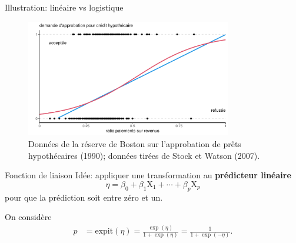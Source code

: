 \documentclass[
  ignorenonframetext,
]{beamer}
\begin{document}
\begin{frame}{Illustration: linéaire vs logistique}
\protect\hypertarget{illustration-linuxe9aire-vs-logistique}{}
\begin{figure}

{\centering \includegraphics[width=0.8\textwidth,height=\textheight]{MATH60602-diapos5_files/figure-beamer/fig-demandecredit-1.pdf}

}

\caption{\label{fig-demandecredit}Données de la réserve de Boston sur
l'approbation de prêts hypothécaires (1990); données tirées de Stock et
Watson (2007).}

\end{figure}
\end{frame}

\begin{frame}{Fonction de liaison}
\protect\hypertarget{fonction-de-liaison}{}
Idée: appliquer une transformation au \textbf{prédicteur linéaire}
\[\eta = \beta_0 + \beta_1 \mathrm{X}_1 + \cdots + \beta_p \mathrm{X}_p\]
pour que la prédiction soit entre zéro et un.

On considère \begin{align*}
 p &= \textrm{expit}(\eta) = \frac{\exp(\eta)}{1+\exp(\eta)}
= \frac{1}{1+\exp(-\eta)}.
\end{align*}
\end{frame}
\end{document}
